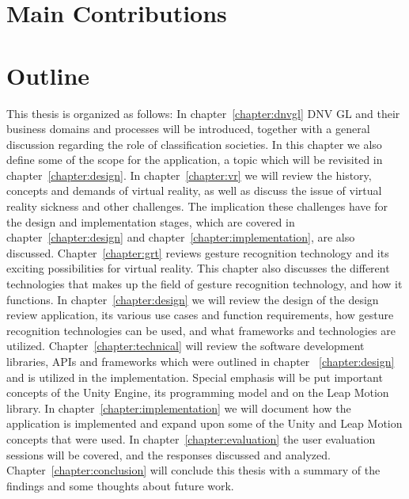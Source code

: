 \section{Main Contributions}


\section{Outline}
This thesis is organized as follows: In chapter~\ref{chapter:dnvgl} DNV GL and their business domains and processes will be introduced, together with a general discussion regarding
the role of classification societies. In this chapter we also define some of the scope for the application, a topic which will be revisited in 
chapter~\ref{chapter:design}. In chapter~\ref{chapter:vr} we will review the history, concepts and demands of virtual reality, as well as discuss the issue of virtual reality
sickness and other challenges. The implication these challenges have for the design and implementation stages, which are covered in chapter~\ref{chapter:design} and
chapter~\ref{chapter:implementation}, are also discussed. Chapter~\ref{chapter:grt} reviews gesture recognition technology and its exciting possibilities for virtual reality.
This chapter also discusses the different technologies that makes up the field of gesture recognition technology, and how it functions. 
In chapter~\ref{chapter:design} we will review the design of the design review application, its various use cases and function requirements, how gesture recognition technologies
can be used, and what frameworks and technologies are utilized. Chapter~\ref{chapter:technical} will review the software development libraries, APIs and frameworks
which were outlined in chapter ~\ref{chapter:design} and is utilized in the implementation. Special emphasis will be put important concepts of the Unity Engine, its programming model
and on the Leap Motion library.  
In chapter~\ref{chapter:implementation} we will document how the application is implemented and expand upon some of the Unity and Leap Motion concepts that were used.
In chapter~\ref{chapter:evaluation} the user evaluation sessions will be covered, and the responses discussed and analyzed.
Chapter~\ref{chapter:conclusion} will conclude this thesis with a summary of the findings and some thoughts about future work.


